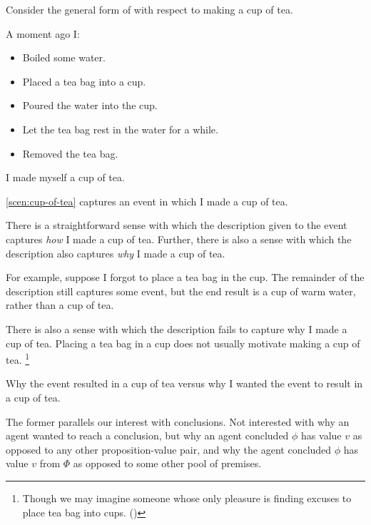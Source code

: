 \begin{note}
  Consider the general form of \qWhy{} with respect to making a cup of tea.

  \begin{scenario}
    \label{scen:cup-of-tea}
    A moment ago I:
    \begin{itemize}[noitemsep]
    \item
      Boiled some water.
    \item
      Placed a tea bag into a cup.
    \item
      Poured the water into the cup.
    \item
      Let the tea bag rest in the water for a while.
    \item
      Removed the tea bag.
    \end{itemize}
    I made myself a cup of tea.
  \end{scenario}

  \autoref{scen:cup-of-tea} captures an event in which I made a cup of tea.

  There is a straightforward sense with which the description given to the event captures \emph{how} I made a cup of tea.
  Further, there is also a sense with which the description also captures \emph{why} I made a cup of tea.

  For example, suppose I forgot to place a tea bag in the cup.
  The remainder of the description still captures some event, but the end result is a cup of warm water, rather than a cup of tea.

  There is also a sense with which the description fails to capture why I made a cup of tea.
  Placing a tea bag in a cup does not usually motivate making a cup of tea.%
  \footnote{
    Though we may imagine someone whose only pleasure is finding excuses to place tea bag into cups.
    (\cite[Cf.][379--380]{Rawls:1999aa})
  }

  Why the event resulted in a cup of tea versus why I wanted the event to result in a cup of tea.

  The former parallels our interest with conclusions.
  Not interested with why an agent wanted to reach a conclusion, but why an agent concluded \(\phi\) has value \(v\) as opposed to any other proposition-value pair, and why the agent concluded \(\phi\) has value \(v\) from \(\Phi\) as opposed to some other pool of premises.
\end{note}

